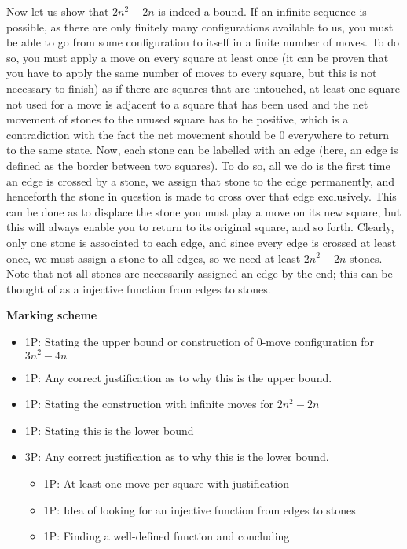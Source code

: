 Now let us show that $2n^2-2n$ is indeed a bound. If an infinite sequence is possible, as there are only finitely many configurations available to us, you must be able to go from some configuration to itself in a finite number of moves. To do so, you must apply a move on every square at least once (it can be proven that you have to apply the same number of moves to every square, but this is not necessary to finish) as if there are squares that are untouched, at least one square not used for a move is adjacent to a square that has been used and the net movement of stones to the unused square has to be positive, which is a contradiction with the fact the net movement should be 0 everywhere to return to the same state. Now, each stone can be labelled with an edge (here, an edge is defined as the border between two squares). To do so, all we do is the first time an edge is crossed by a stone, we assign that stone to the edge permanently, and henceforth the stone in question is made to cross over that edge exclusively. This can be done as to displace the stone you must play a move on its new square, but this will always enable you to return to its original square, and so forth. Clearly, only one stone is associated to each edge, and since every edge is crossed at least once, we must assign a stone to all edges, so we need at least $2n^2-2n$ stones. Note that not all stones are necessarily assigned an edge by the end; this can be thought of as a injective function from edges to stones. 

\textbf{Marking scheme} 
\begin{itemize}
  
\item 1P: Stating the upper bound or construction of 0-move configuration for $3n^2-4n$
\item 1P: Any correct justification as to why this is the upper bound. 
\item 1P: Stating the construction with infinite moves for $2n^2-2n$ 
\item 1P: Stating this is the lower bound
\item 3P: Any correct justification as to why this is the lower bound. \begin{itemize}
            \item 1P: At least one move per square with justification
            \item 1P: Idea of looking for an injective function from edges to stones
            \item 1P: Finding a well-defined function and concluding
        \end{itemize}
\end{itemize}